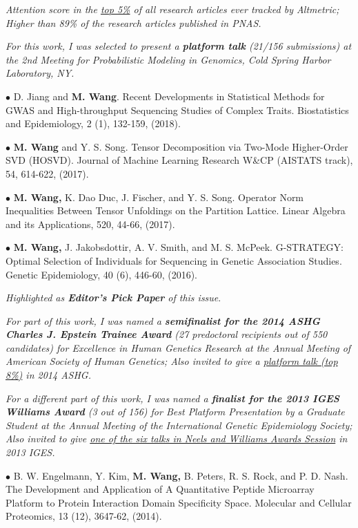 \documentclass[letterpaper]{article}
\renewenvironment{itemize}{
  \begin{list}{}{
    \setlength{\leftmargin}{1.5em}
  }
}{
  \end{list}
}
\begin{document}
\begin{itemize}
{\it Attention score in the \underline{top 5\%} of all research articles ever tracked by Altmetric; Higher than 89\% of the research articles published in PNAS.}

{\it For this work, I was selected to present a \emph{\bf platform talk} (21/156 submissions) at the 2nd Meeting for Probabilistic Modeling in Genomics, Cold Spring Harbor Laboratory, NY.}

\item$\bullet$ D. Jiang and {\bf M. Wang}. Recent Developments in Statistical Methods for GWAS and High-throughput Sequencing Studies of Complex Traits. Biostatistics and Epidemiology, 2 (1), 132-159, (2018).

\item$\bullet$  {\bf M. Wang} and Y. S. Song. Tensor Decomposition via Two-Mode Higher-Order SVD (HOSVD). Journal of Machine Learning Research W\&CP (AISTATS track), 54, 614-622, (2017).

\item$\bullet$ {\bf M. Wang,} K. Dao Duc, J. Fischer, and Y. S. Song. Operator Norm Inequalities Between Tensor Unfoldings on the Partition Lattice. Linear Algebra and its Applications, 520, 44-66, (2017).

\item$\bullet$  {\bf M. Wang,} J. Jakobsdottir, A. V. Smith, and M. S. McPeek. G-STRATEGY: Optimal Selection of Individuals for Sequencing in Genetic Association Studies. Genetic Epidemiology, 40 (6), 446-60, (2016).

\vspace{.1cm}
{\it Highlighted as {\bf Editor's Pick Paper} of this issue}.
\vspace{.1cm}

{\it For part of this work, I was named a {\bf semifinalist for the 2014 ASHG Charles J. Epstein Trainee
Award} (27 predoctoral recipients out of 550 candidates) for Excellence in Human Genetics Research at the Annual Meeting of American Society of Human Genetics; Also invited to give a \underline{platform talk (top 8\%)} in 2014 ASHG.}


{\it For a different part of this work, I was named a {\bf finalist for the 2013 IGES Williams Award} (3 out of 156) for
Best Platform Presentation by a Graduate Student at the Annual Meeting of the International Genetic Epidemiology Society; Also invited to give \underline{one of the six talks in Neels and Williams Awards Session} in 2013 IGES.}


\item$\bullet$  B. W. Engelmann, Y. Kim, {\bf M. Wang,} B. Peters, R. S. Rock, and P. D. Nash. The Development and Application of A Quantitative Peptide Microarray Platform to Protein Interaction Domain Specificity Space. Molecular and Cellular Proteomics, 13 (12), 3647-62, (2014).
\end{itemize}
\end{document}
